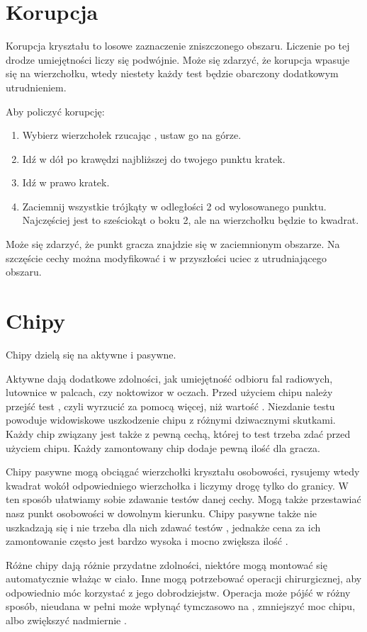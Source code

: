 \section{Korupcja}
Korupcja kryształu to losowe zaznaczenie zniszczonego obszaru.
Liczenie po tej drodze umiejętności liczy się podwójnie.
Może się zdarzyć, że korupcja wpasuje się na wierzchołku, wtedy niestety każdy test będzie obarczony dodatkowym utrudnieniem.

Aby policzyć korupcję:
\begin{enumerate}
 \item Wybierz wierzchołek rzucając \dvi{}, ustaw go na górze.
 \item Idź w dół po krawędzi najbliższej do twojego punktu \dxx{} kratek.
 \item Idź w prawo \dxx[2]{} kratek.
 \item Zaciemnij wszystkie trójkąty w odległości 2 od wylosowanego punktu. Najczęściej jest to sześciokąt o boku 2, ale na wierzchołku będzie to kwadrat.
\end{enumerate}
Może się zdarzyć, że punkt gracza znajdzie się w zaciemnionym obszarze. 
Na szczęście cechy można modyfikować i w przyszłości uciec z utrudniającego obszaru.

\section{Chipy}
Chipy dzielą się na aktywne i pasywne.

Aktywne dają dodatkowe zdolności, jak umiejętność odbioru fal radiowych, lutownice w palcach, czy noktowizor w oczach.
Przed użyciem chipu należy przejść test \abnkp{}, czyli wyrzucić za pomocą \dxx{} więcej, niż wartość \abnkp{}. 
Niezdanie testu \abnkp{} powoduje widowiskowe uszkodzenie chipu z różnymi dziwacznymi skutkami.
Każdy chip związany jest także z pewną cechą, której to test trzeba zdać przed użyciem chipu.
Każdy zamontowany chip dodaje pewną ilość \abnkp{} dla gracza.

Chipy pasywne mogą obciągać wierzchołki kryształu osobowości, rysujemy wtedy kwadrat wokół odpowiedniego wierzchołka i liczymy drogę tylko do granicy.
W ten sposób ułatwiamy sobie zdawanie testów danej cechy.
Mogą także przestawiać nasz punkt osobowości w dowolnym kierunku.
Chipy pasywne także nie uszkadzają się i nie trzeba dla nich zdawać testów \abnkp{}, jednakże cena za ich zamontowanie często jest bardzo wysoka i mocno zwiększa ilość \abnkp{}.

Różne chipy dają różnie przydatne zdolności, niektóre mogą montować się automatycznie włażąc w ciało.
Inne mogą potrzebować operacji chirurgicznej, aby odpowiednio móc korzystać z jego dobrodziejstw.
Operacja może pójść w różny sposób, nieudana w pełni może wpłynąć tymczasowo na \abzyc{}, zmniejszyć moc chipu, albo zwiększyć nadmiernie \abnkp{}.

